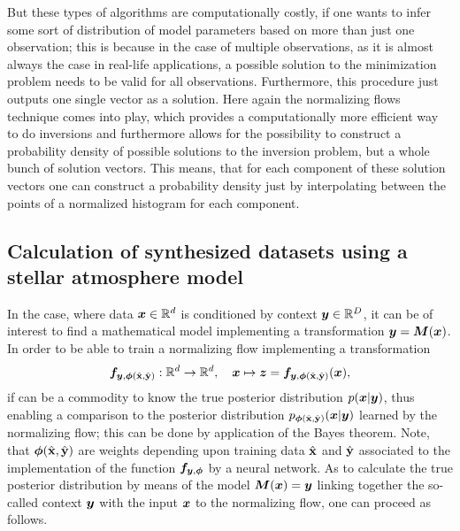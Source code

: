 \documentclass[a4paper,12pt]{report}
\def\lk#1{{\color{black}{#1}}}
\begin{document}
But these types of algorithms are computationally costly, if one wants to infer some sort of distribution of model parameters based on more than just one observation; this is because in the case of multiple observations, as it is almost always the case in real-life applications, a possible solution to the minimization problem needs to be valid for all observations. Furthermore, this procedure just outputs one single vector as a solution. Here again the normalizing flows technique comes into play, which provides a computationally more efficient way to do inversions and furthermore allows for the possibility to construct a probability density of possible solutions to the inversion problem, \lk{because a trained normalizing flow outputs not just one single vector,} but a whole bunch of solution vectors. This means, that for each component of these solution vectors one can construct a probability density just by interpolating between the points of a normalized histogram for each component.

\subsection{Calculation of synthesized datasets using a stellar atmosphere model}\label{sec:calcsyntheticdatasets}
In the case, where data $\bm{x} \in \mathbb{R}^d$ is conditioned by context $\bm{y} \in \mathbb{R}^D$, it can be of interest to find a mathematical model implementing a transformation $\bm{y} = \bm{M}(\bm{x})$. In order to be able to train a normalizing flow implementing a transformation \begin{gather}
\bm{f}_{\bm{y},\bm{\phi}(\hat{\boldsymbol{\mathbf{x}}},\hat{\boldsymbol{\mathbf{y}}})}: \mathbb{R}^d\rightarrow \mathbb{R}^d, \quad \bm{x}\mapsto \bm{z} =  \bm{f}_{\bm{y},\bm{\phi}(\hat{\boldsymbol{\mathbf{x}}},\hat{\boldsymbol{\mathbf{y}}})}(\bm{x}),
\end{gather} if can be a commodity to know the true posterior distribution $p(\bm{x}|\bm{y})$, thus enabling a comparison to the posterior distribution $p_{\bm{\phi}(\hat{\boldsymbol{\mathbf{x}}},\hat{\boldsymbol{\mathbf{y}}})}(\bm{x}|\bm{y})$ learned by the normalizing flow; this can be done by application of the Bayes theorem. Note, that $\bm{\phi}(\hat{\boldsymbol{\mathbf{x}}},\hat{\boldsymbol{\mathbf{y}}})$ are weights depending upon training data $\hat{\boldsymbol{\mathbf{x}}}$ and $\hat{\boldsymbol{\mathbf{y}}}$ associated to the implementation of the function $\bm{f}_{\bm{y},\bm{\phi}}$ by a neural network. As to calculate the true posterior distribution by means of the model $\bm{M}(\bm{x}) = \bm{y}$ linking together the so-called context $\bm{y}$ with the input $\bm{x}$ to the normalizing flow, one can proceed as follows.
\end{document}
